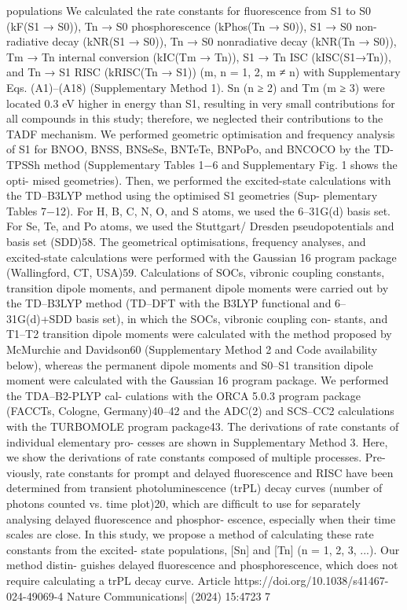populations
We calculated the rate constants for ﬂuorescence from S1 to S0
(kF(S1 → S0)), Tn → S0 phosphorescence (kPhos(Tn → S0)), S1 → S0 non-
radiative
decay
(kNR(S1 → S0)),
Tn → S0
nonradiative
decay
(kNR(Tn → S0)), Tm → Tn internal conversion (kIC(Tm → Tn)), S1 → Tn ISC
(kISC(S1→Tn)), and Tn → S1 RISC (kRISC(Tn → S1)) (m, n = 1, 2, m ≠ n) with
Supplementary Eqs. (A1)–(A18) (Supplementary Method 1). Sn (n ≥ 2)
and Tm (m ≥ 3) were located 0.3 eV higher in energy than S1, resulting in
very small contributions for all compounds in this study; therefore, we
neglected their contributions to the TADF mechanism. We performed
geometric optimisation and frequency analysis of S1 for BNOO, BNSS,
BNSeSe, BNTeTe, BNPoPo, and BNCOCO by the TD-TPSSh method
(Supplementary Tables 1−6 and Supplementary Fig. 1 shows the opti-
mised geometries). Then, we performed the excited-state calculations
with the TD–B3LYP method using the optimised S1 geometries (Sup-
plementary Tables 7−12). For H, B, C, N, O, and S atoms, we used the
6–31G(d) basis set. For Se, Te, and Po atoms, we used the Stuttgart/
Dresden pseudopotentials and basis set (SDD)58. The geometrical
optimisations, frequency analyses, and excited-state calculations were
performed with the Gaussian 16 program package (Wallingford,
CT, USA)59.
Calculations of SOCs, vibronic coupling constants, transition
dipole moments, and permanent dipole moments were carried out by
the TD–B3LYP method (TD–DFT with the B3LYP functional and
6–31G(d)+SDD basis set), in which the SOCs, vibronic coupling con-
stants, and T1–T2 transition dipole moments were calculated with the
method proposed by McMurchie and Davidson60 (Supplementary
Method 2 and Code availability below), whereas the permanent dipole
moments and S0–S1 transition dipole moment were calculated with the
Gaussian 16 program package. We performed the TDA–B2-PLYP cal-
culations with the ORCA 5.0.3 program package (FACCTs, Cologne,
Germany)40–42 and the ADC(2) and SCS–CC2 calculations with the
TURBOMOLE program package43.
The derivations of rate constants of individual elementary pro-
cesses are shown in Supplementary Method 3. Here, we show the
derivations of rate constants composed of multiple processes. Pre-
viously, rate constants for prompt and delayed ﬂuorescence and RISC
have been determined from transient photoluminescence (trPL) decay
curves (number of photons counted vs. time plot)20, which are difﬁcult
to use for separately analysing delayed ﬂuorescence and phosphor-
escence, especially when their time scales are close. In this study, we
propose a method of calculating these rate constants from the excited-
state populations, [Sn] and [Tn] (n = 1, 2, 3, ...). Our method distin-
guishes delayed ﬂuorescence and phosphorescence, which does not
require calculating a trPL decay curve.
Article
https://doi.org/10.1038/s41467-024-49069-4
Nature Communications|        (2024) 15:4723 
7


